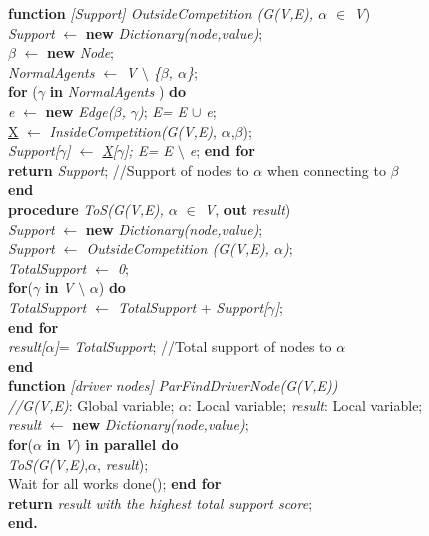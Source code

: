 \documentclass[5p,,preprint,12pt]{elsarticle}
\begin{document}
\textbf{function} \textit{[Support] OutsideCompetition (G(V,E), $\alpha$ $\in$ V}) \\
\textit{Support} $\gets$ \textbf{new} \textit{Dictionary(node,value)}; \\
$\beta$ $\gets$ \textbf{new} \textit{Node}; \\
\textit{NormalAgents $\gets$ V $\setminus$ \{$\beta$, $\alpha$\}}; \\
\textbf{for} ($\gamma$ \textbf{in}  \textit{NormalAgents} ) \textbf{do}   \\
\hspace{0.5cm}  \textit{e} $\gets$ \textbf{new} \textit{Edge($\beta$, $\gamma$)}; \textit{E= E $\cup$ e}; \\
\hspace{0.5cm}  \underline{X} $\gets$ \textit{InsideCompetition(G(V,E)}, $\alpha$,$\beta$); \\
\textit{Support[$\gamma$] $\gets$  \underline{X}[$\gamma$]; E= E $\setminus$ e}; \textbf{end for} \\ 
\textbf{return} \textit{Support}; //Support of nodes to $\alpha$ when connecting to $\beta$ \\
\textbf{end} \\
\textbf{procedure} \textit{ToS(G(V,E), $\alpha$ $\in$ V}, \textbf{out}     \textit{result}) \\
\textit{Support} $\gets$ \textbf{new} \textit{Dictionary(node,value)}; \\
\textit{Support $\gets$ OutsideCompetition (G(V,E), $\alpha$)}; \\
\textit{TotalSupport $\gets$ 0}; \\
\textbf{for}($\gamma$ \textbf{in} \textit{V} $\setminus$ $\alpha$) \textbf{do} \\
\hspace{0.5cm}  \textit{TotalSupport $\gets$  TotalSupport} + \textit{Support[$\gamma$]}; \\
\textbf{end for} \\
\textit{result[$\alpha$]}= \textit{TotalSupport}; //Total support of nodes to $\alpha$ \\
\textbf{end} \\
\textbf{function} \textit{[driver nodes]} \textit{ParFindDriverNode(G(V,E))} \\
\textit{//G(V,E)}: Global variable; \textit{$\alpha$}: Local variable; \textit{result}: Local variable; \\
\textit{result} $\gets$ \textbf{new} \textit{Dictionary(node,value)}; \\
\textbf{for}($\alpha$ \textbf{in} \textit{V}) \textbf{in parallel do} \\
\hspace{0.5cm}  \textit{ToS(G(V,E)},$\alpha$, \textit{result}); \\
Wait for all works done();\textbf{ end for} \\
\textbf{return} \textit{result with the highest total support score}; \\
\textbf{end.} 
\end{document}
